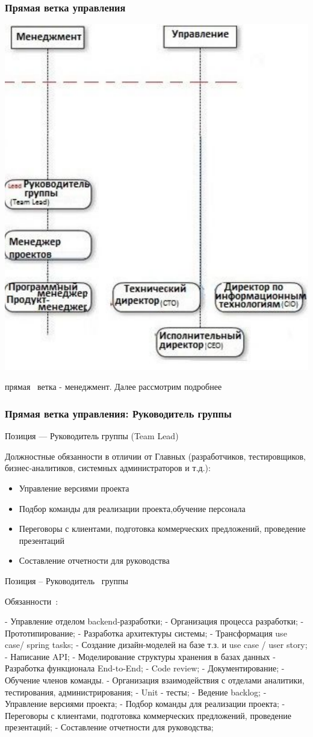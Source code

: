 \documentclass{../industrial-development}
\begin{document}
{\begin{frame} \frametitle{Прямая ветка управления}
  \centerline{\includegraphics[width=0.63\linewidth]{11-IT-specialist's-way/sch22a.pdf}}
\end{frame}
 прямая~\cite{mc} ветка  -  менеджмент. Далее рассмотрим подробнее



\begin{frame} \frametitle{Прямая ветка управления: Руководитель группы}
 \begin{block}{}
  \alert{Позиция --- Руководитель группы (Team Lead)}

Должностные обязанности в отличии от Главных (разработчиков, тестировщиков, бизнес-аналитиков, системных администраторов и т.д.): 
  \end{block}
  \begin{itemize}
  \item Управление версиями проекта
  \item Подбор команды для реализации проекта,обучение персонала
 \item  Переговоры с клиентами, подготовка коммерческих предложений, проведение презентаций
  \item Составление отчетности для руководства
  \end{itemize}
\end{frame}

\lecturenotes
Позиция – Руководитель~\cite{hh} группы~\cite{itcf}

Обязанности~\cite{rab}:

- Управление отделом backend-разработки;
- Организация процесса разработки;
- Прототипирование;
- Разработка архитектуры системы;
- Трансформация use case/ spring tasks;
- Создание дизайн-моделей на базе т.з. и use case / user story;
- Написание API;
- Моделирование структуры хранения в базах данных
- Разработка функционала End-to-End;
- Code review;
- Документирование;
- Обучение членов команды.
- Организация взаимодействия с отделами аналитики, тестирования, администрирования;
- Unit - тесты;
- Ведение backlog;
- Управление версиями проекта;
- Подбор команды для реализации проекта;
- Переговоры с клиентами, подготовка коммерческих предложений, проведение презентаций;
- Составление отчетности для руководства;

}
\end{document}
